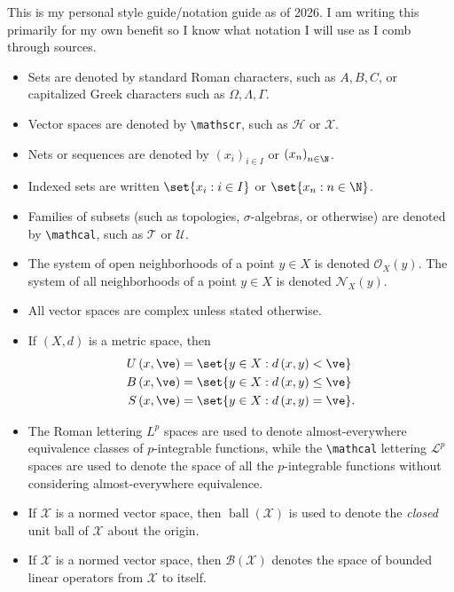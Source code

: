 \documentclass[10pt]{mypackage}
\begin{document}
\RaggedRight
This is my personal style guide/notation guide as of 2026. I am writing this primarily for my own benefit so I know what notation I will use as I comb through sources.
\begin{itemize}
  \item Sets are denoted by standard Roman characters, such as $A,B,C$, or capitalized Greek characters such as $\Omega,\Lambda,\Gamma$.
  \item Vector spaces are denoted by \verb|\mathscr|, such as $ \mathscr{H} $ or $\mathscr{X}$.
  \item Nets or sequences are denoted by $\left( x_i \right)_{i\in I}$ or $\left( x_n \right)_{n\in \N}$.
  \item Indexed sets are written $\set{x_i : i\in I}$ or $\set{x_n : n\in \N}$.
  \item Families of subsets (such as topologies, $\sigma$-algebras, or otherwise) are denoted by \verb|\mathcal|, such as $\mathcal{T}$ or $\mathcal{U}$.
  \item The system of open neighborhoods of a point $y\in X$ is denoted $ \mathcal{O}_{X}(y) $. The system of all neighborhoods of a point $y\in X$ is denoted $\mathcal{N}_{X}(y)$.
  \item All vector spaces are complex unless stated otherwise.
  \item If $\left( X,d \right)$ is a metric space, then 
    \begin{align*}
      U\left( x,\ve \right) &= \set{y\in X : d\left( x,y \right) < \ve}\\
      B\left( x,\ve \right) &= \set{y\in X : d\left( x,y \right) \leq \ve}\\
      S\left( x,\ve \right) &= \set{y\in X : d\left( x,y \right) = \ve}.
    \end{align*}
  \item The Roman lettering $L^p$ spaces are used to denote almost-everywhere equivalence classes of $p$-integrable functions, while the \verb|\mathcal| lettering $ \mathcal{L}^p $ spaces are used to denote the space of all the $p$-integrable functions without considering almost-everywhere equivalence.
  \item If $ \mathscr{X} $ is a normed vector space, then $ \operatorname{ball}\left( \mathscr{X} \right) $ is used to denote the \textit{closed} unit ball of $ \mathscr{X} $ about the origin.
  \item If $ \mathscr{X} $ is a normed vector space, then $ \mathcal{B}\left( \mathscr{X} \right) $ denotes the space of bounded linear operators from $\mathscr{X}$ to itself.

\end{itemize}
\end{document}
